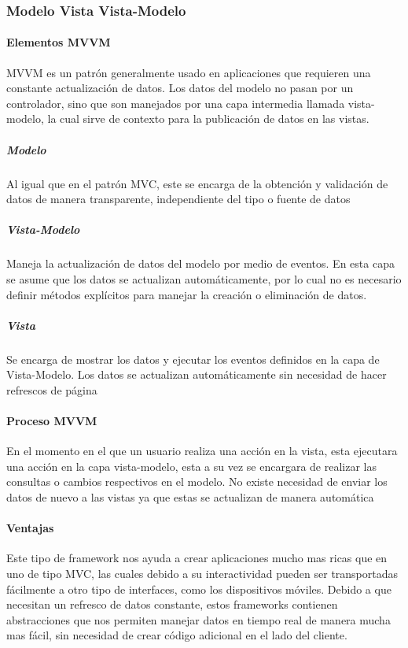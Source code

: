 \subsubsection{Modelo Vista Vista-Modelo}

\paragraph{Elementos MVVM}
MVVM es un patrón generalmente usado en aplicaciones que requieren una
constante actualización de datos. Los datos del modelo no pasan por un
controlador, sino que son manejados por una capa intermedia llamada
vista-modelo, la cual sirve de contexto para la publicación de datos
en las vistas.

\subparagraph{Modelo}
Al igual que en el patrón MVC, este se encarga de la obtención y
validación de datos de manera transparente, independiente del
tipo o fuente de datos

\subparagraph{Vista-Modelo}
Maneja la actualización de datos del modelo por medio de eventos. En esta capa
se asume que los datos se actualizan automáticamente, por lo cual no es
necesario definir métodos explícitos para manejar la creación o eliminación
de datos.

\subparagraph{Vista}
Se encarga de mostrar los datos y ejecutar los eventos definidos en la
capa de Vista-Modelo. Los datos se actualizan automáticamente sin necesidad
de hacer refrescos de página

\paragraph{Proceso MVVM}
En el momento en el que un usuario realiza una acción en la vista, esta ejecutara
una acción en la capa vista-modelo, esta a su vez se encargara de realizar las
consultas o cambios respectivos en el modelo. No existe necesidad de enviar los
datos de nuevo a las vistas ya que estas se actualizan de manera automática

\paragraph{Ventajas}
Este tipo de framework nos ayuda a crear aplicaciones mucho mas ricas
que en uno de tipo MVC, las cuales debido a su interactividad pueden
ser transportadas fácilmente a otro tipo de interfaces, como los
dispositivos móviles.
Debido a que necesitan un refresco de datos constante, estos frameworks
contienen abstracciones que nos permiten manejar datos en tiempo real
de manera mucha mas fácil, sin necesidad de crear código adicional en
el lado del cliente.

